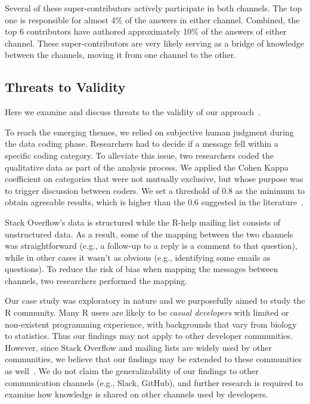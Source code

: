 \documentclass[smallextended]{svjour3}       %
\newcommand{\SO}{Stack Overflow\xspace}
\newcommand{\RH}{R-help\xspace}
\begin{document}
Several of these super-contributors actively participate in both channels. The top one is responsible for almost 4\% of
the answers in either channel. Combined, the top 6 contributors have authored approximately 10\% of the answers of
either channel. These super-contributors are very likely serving as a bridge of knowledge between the channels, moving
it from one channel to the other.


\subsection{Threats to Validity}
\label{cha:threats}
Here we examine and discuss threats to the validity of our approach~\cite{Runeson2012}.

\begin{description}[itemsep=3pt, topsep=2pt, leftmargin=1em, parsep=0pt]

\item[Construct validity:] To reach the emerging themes, we relied on subjective human judgment during the data coding
  phase. Researchers had to decide if a message fell within a specific coding category. To alleviate this issue, two
  researchers coded the qualitative data as part of the analysis process. We applied the Cohen Kappa coefficient on
  categories that were not mutually exclusive, but whose purpose was to trigger discussion between coders. We set a
  threshold of 0.8 as the minimum to obtain agreeable results, which is higher than the 0.6 suggested in the
  literature~\cite{Landis1977}.

\item[Internal validity:] \SO's data is structured while the \RH mailing list consists of unstructured data. As a
  result, some of the mapping between the two channels was straightforward (e.g., a follow-up to a reply is a comment to
  that question), while in other cases it wasn't as obvious (e.g., identifying some emails as questions). To reduce the
  risk of bias when mapping the messages between channels, two researchers performed the mapping.

\item[External validity:] Our case study was exploratory in nature and we purposefully aimed to study the R
  community. Many R users are likely to be \textit{casual developers} with limited or non-existent programming
  experience, with backgrounds that vary from biology to statistics. Thus our findings may not apply to other developer
  communities. However, since \SO and mailing lists are widely used by other communities, we believe that our findings
  may be extended to these communities as well~\cite{Squire2015a}. We do not claim the generalizability of our findings
  to other communication channels (e.g., Slack, GitHub), and further research is required to examine how knowledge is
  shared on other channels used by developers.

\end{description}
\end{document}
